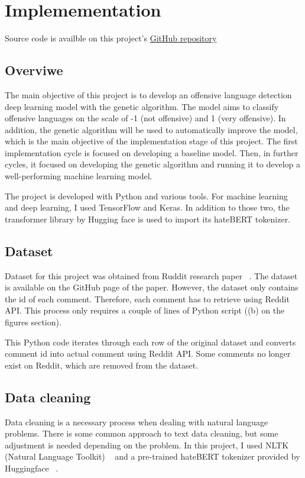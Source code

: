 \documentclass[11pt, natbib=false]{article}
\begin{document}
\section{Implemementation}
Source code is availble on this project's \href{https://github.com/hayacon/cs_final_project}{GitHub repository}
\subsection{Overviwe}
The main objective of this project is to develop an offensive language detection deep learning model with the genetic algorithm.
The model aims to classify offensive languages on the scale of -1 (not offensive) and 1 (very offensive).
In addition, the genetic algorithm will be used to automatically improve the model, which is the main objective of the implementation stage of this project.
The first implementation cycle is focused on developing a baseline model.
Then, in further cycles, it focused on developing the genetic algorithm and running it to develop a well-performing machine learning model.

The project is developed with Python and various tools.
For machine learning and deep learning, I used TensorFlow and Keras.
In addition to those two, the transformer library by Hugging face is used to import its hateBERT tokenizer.

\subsection{Dataset}
Dataset for this project was obtained from Ruddit research paper ~\cite{hada2021ruddit}.
The dataset is available on the GitHub page of the paper.
However, the dataset only contains the id of each comment.
Therefore, each comment has to retrieve using Reddit API.
This process only requires a couple of lines of Python script ((b) on the figures section).

This Python code iterates through each row of the original dataset and converts comment id into actual comment using Reddit API.
Some comments no longer exist on Reddit, which are removed from the dataset.

\subsection{Data cleaning}
Data cleaning is a necessary process when dealing with natural language problems.
There is some common approach to text data cleaning, but some adjustment is needed depending on the problem.
In this project, I used NLTK (Natural Language Toolkit) ~\cite{nltk} and a pre-trained hateBERT tokenizer provided by Huggingface ~\cite{huggingface}.
\end{document}
